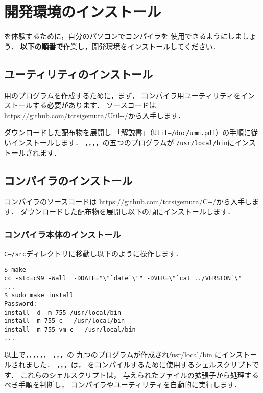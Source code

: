 % 
%
\chapter{\cmml 開発環境のインストール}

\cmml を体験するために，自分のパソコンで\cmm コンパイラを
使用できるようにしましょう．
{\bf 以下の順番で}作業し，開発環境をインストールしてください．


\section{ユーティリティのインストール}

{\tac}用のプログラムを作成するために，まず，
{\cmm}コンパイラ用ユーティリティをインストールする必要があります．
ソースコードは
\url{https://github.com/tctsigemura/Util--/}から入手します．

ダウンロードした配布物を展開し
「{\util}解説書」（{\tt Util--/doc/umm.pdf}）の手順に従いインストールします．
{\as}，{\ld}，{\objbin}，{\objexe}，{\size}の五つのプログラムが
{\tt /usr/local/bin}にインストールされます．

\section{コンパイラのインストール}
\label{chap2:compilerl}

{\cmm}コンパイラのソースコードは
\url{https://github.com/tctsigemura/C--/}から入手します．
ダウンロードした配布物を展開し以下の順にインストールします．

\subsection{コンパイラ本体のインストール}

{\tt C--/src}ディレクトリに移動し以下のように操作します．

\begin{mylist}
\begin{verbatim}
$ make
cc -std=c99 -Wall  -DDATE="\"`date`\"" -DVER=\"`cat ../VERSION`\"
...
$ sudo make install
Password:
install -d -m 755 /usr/local/bin
install -m 755 c-- /usr/local/bin
install -m 755 vm-c-- /usr/local/bin
...
\end{verbatim}
\end{mylist}

以上で，{\cme}，{\cmc}，{\cmi}，{\cmv}，{\cmmc}，
{\ccmmc}，{\rtccmmc}，{\icmmc}，{\vcmmc}の
九つのプログラムが作成され\|/usr/local/bin|にインストールされました．
{\cme}，{\cmc}，{\cmi}，{\cmv}は，
{\cmml}をコンパイルするために使用するシェルスクリプトです．
これらのシェルスクリプトは，
与えられたファイルの拡張子から処理するべき手順を判断し，
コンパイラやユーティリティを自動的に実行します．

